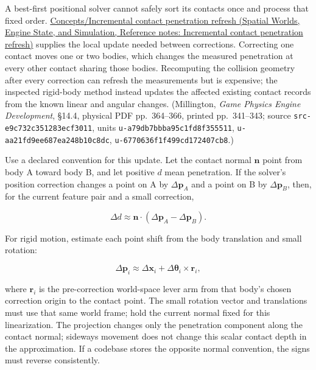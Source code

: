 A best-first positional solver cannot safely sort its contacts once and process that fixed order. \href{../05-Spatial-Worlds-Engine-State-and-Simulation/main.pdf\#nameddest=appendix-f682275acbdf}{Concepts/Incremental contact penetration refresh (Spatial Worlds, Engine State, and Simulation, Reference notes: Incremental contact penetration refresh)} supplies the local update needed between corrections. Correcting one contact moves one or two bodies, which changes the measured penetration at every other contact sharing those bodies. Recomputing the collision geometry after every correction can refresh the measurements but is expensive; the inspected rigid-body method instead updates the affected existing contact records from the known linear and angular changes. (Millington, \emph{Game Physics Engine Development}, §14.4, physical PDF pp.~364--366, printed pp.~341--343; source \texttt{src-e9c732c351283ecf3011}, units \texttt{u-a79db7bbba95c1fd8f355511}, \texttt{u-aa21fd9ee687ea248b10c8dc}, \texttt{u-6770636f1f499cd172407cb8}.)

Use a declared convention for this update. Let the contact normal \(\mathbf n\) point from body A toward body B, and let positive \(d\) mean penetration. If the solver's position correction changes a point on A by \(\Delta\mathbf p_A\) and a point on B by \(\Delta\mathbf p_B\), then, for the current feature pair and a small correction,

\[
\Delta d\approx \mathbf n\cdot(\Delta\mathbf p_A-\Delta\mathbf p_B).
\]

For rigid motion, estimate each point shift from the body translation and small rotation:

\[
\Delta\mathbf p_i\approx \Delta\mathbf x_i+\Delta\boldsymbol\theta_i\times\mathbf r_i,
\]

where \(\mathbf r_i\) is the pre-correction world-space lever arm from that body's chosen correction origin to the contact point. The small rotation vector and translations must use that same world frame; hold the current normal fixed for this linearization. The projection changes only the penetration component along the contact normal; sideways movement does not change this scalar contact depth in the approximation. If a codebase stores the opposite normal convention, the signs must reverse consistently.

